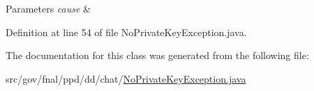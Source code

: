 \begin{DoxyParams}{Parameters}
{\em cause} & \\
\hline
\end{DoxyParams}


Definition at line 54 of file No\-Private\-Key\-Exception.\-java.



The documentation for this class was generated from the following file\-:\begin{DoxyCompactItemize}
\item 
src/gov/fnal/ppd/dd/chat/\hyperlink{NoPrivateKeyException_8java}{No\-Private\-Key\-Exception.\-java}\end{DoxyCompactItemize}
